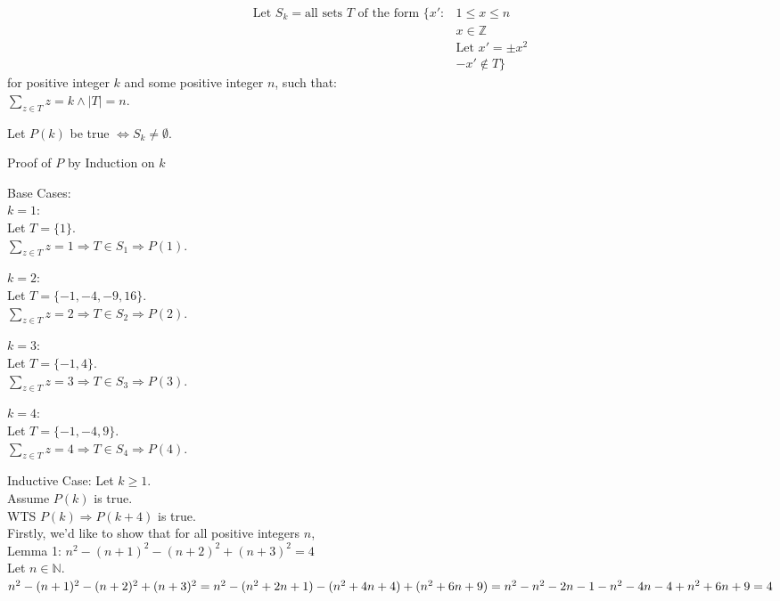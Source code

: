 \documentclass[fleqn]{article}
\begin{document}
\begin{align*}
  \text{Let } S_{k} = \text{all sets $T$ of the form }
                      \lbrace x' : & 1 \leq x \leq n \\
                                   & x \in \mathbb{Z} \\
                                   & \text{Let } x' = \pm x^2 \\
                                   & -x' \not\in T
                      \rbrace
\end{align*}
for positive integer $k$ and some positive integer $n$, such that:\\
$\displaystyle\sum\limits_{z \in T} z = k \wedge  |T| = n$.

Let $P(k)$ be true $\Leftrightarrow S_{k} \not= \emptyset $.

Proof of $P$ by Induction on $k$

Base Cases:\\
$k = 1:$\\
Let $T = \lbrace 1 \rbrace$.\\
$\displaystyle\sum\limits_{z \in T} z = 1 \Rightarrow
T \in S_{1} \Rightarrow P(1)$.

$k = 2:$\\
Let $T = \lbrace -1,-4,-9,16 \rbrace$.\\
$\displaystyle\sum\limits_{z \in T} z = 2 \Rightarrow 
T \in S_{2} \Rightarrow P(2)$.

$k = 3:$\\
Let $T = \lbrace-1,4\rbrace$.\\
$\displaystyle\sum\limits_{z \in T} z = 3 \Rightarrow 
T \in S_{3} \Rightarrow P(3)$.

$k = 4:$\\
Let $T = \lbrace -1,-4,9 \rbrace$.\\
$\displaystyle\sum\limits_{z \in T} z = 4 \Rightarrow 
T \in S_{4} \Rightarrow P(4)$.

Inductive Case: Let $k \geq 1$.\\
Assume $P(k)$ is true.\\
WTS $P(k) \Rightarrow P(k+4)$ is true.\\
Firstly, we'd like to show that for all positive integers $n$, \\
Lemma 1: $n^2 - (n+1)^2 - (n+2)^2 + (n+3)^2 = 4$\\
Let $n \in \mathbb{N}$.\\
$n^2 - (n+1) ^2 - (n+2)^2 + (n+3)^2 =\\
n^2 - (n^2 + 2n + 1) - (n^2 + 4n + 4) + (n^2 + 6n + 9) =\\
n^2 - n^2 - 2n - 1 - n^2 - 4n - 4 + n^2 + 6n + 9 = \\
4 $
\end{document}
